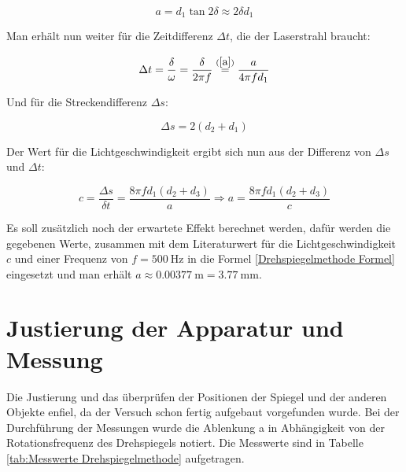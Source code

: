 \begin{equation} \label{a}
    a = d_1 \tan{2\delta} \approx 2\delta d_1
\end{equation}

Man erhält nun weiter für die Zeitdifferenz $\Delta t$, die der Laserstrahl braucht:

\begin{equation}
    \Delta t = \frac{\delta}{\omega} = \frac{\delta}{2\pi f} \stackrel{(\ref{a})}{=} \frac{a}{4\pi f d_1}
\end{equation}

Und für die Streckendifferenz $\Delta s$:

\begin{equation}
    \Delta s = 2(d_2 + d_1)
\end{equation}

Der Wert für die Lichtgeschwindigkeit ergibt sich nun aus der Differenz von $\Delta s$ und $\Delta t$:

\begin{equation} \label{Drehspiegelmethode Formel}
    c = \frac{\Delta s}{\delta t} = \frac{8\pi f d_1 ( d_2 + d_3)}{a}
    \Rightarrow a = \frac{8 \pi f d_1 (d_2 + d_3)}{c}
\end{equation}

Es soll zusätzlich noch der erwartete Effekt berechnet werden, dafür werden die gegebenen Werte, zusammen mit dem Literaturwert für die Lichtgeschwindigkeit $c$ und einer Frequenz von $f = \SI{500}{\Hz}$ in die Formel \ref{Drehspiegelmethode Formel} eingesetzt und man erhält $a \approx \SI{0.00377}{\metre} = \SI{3.77}{\milli\metre}$.

\section{Justierung der Apparatur und Messung}

Die Justierung und das überprüfen der Positionen der Spiegel und der anderen Objekte enfiel, da der Versuch schon fertig aufgebaut vorgefunden wurde. Bei der Durchführung der Messungen wurde die Ablenkung a in Abhängigkeit von der Rotationsfrequenz des Drehspiegels notiert. Die Messwerte sind in Tabelle \ref{tab:Messwerte Drehspiegelmethode} aufgetragen.


